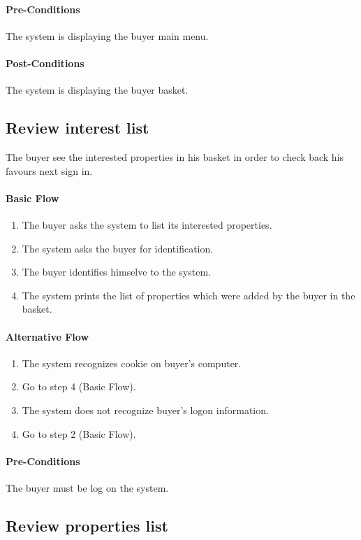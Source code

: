 \documentclass[a4paper,12pt]{article}
\begin{document}
\paragraph{Pre-Conditions}
The system is displaying the buyer main menu.
\paragraph{Post-Conditions}
The system is displaying the buyer basket.

\subsection{Review interest list}

The buyer see the interested properties in his basket in order to check back his favours next sign in.

\paragraph{Basic Flow}
\begin{enumerate}
\item The buyer asks the system to list its interested properties.
\item The system asks the buyer for identification.
\item The buyer identifies himselve to the system.
\item The system prints the list of properties which were added by the buyer in the basket.
\end{enumerate}
\paragraph{Alternative Flow}
\begin{enumerate}
\item The system recognizes cookie on buyer's computer. 
\item Go to step 4 (Basic Flow).
\item The system does not recognize buyer's logon information.
\item Go to step 2 (Basic Flow).
\end{enumerate}
\paragraph{Pre-Conditions}
The buyer must be log on the system.


\subsection{Review properties list}
\end{document}
